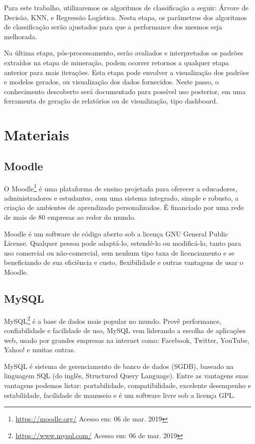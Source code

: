 Para este trabalho, utilizaremos os algoritmos de classificação a seguir: Árvore
de Decisão, KNN, e Regressão Logística. Nesta etapa, os parâmetros dos
algoritmos de classificação serão ajustados para que a performance dos mesmos
seja melhorada.

Na última etapa, pós-processamento, serão avaliados e interpretados os padrões
extraídos na etapa de mineração, podem ocorrer retornos a qualquer etapa
anterior para mais iterações. Esta etapa pode envolver a visualização dos
padrões e modelos gerados, ou visualização dos dados fornecidos. Neste passo, o
conhecimento descoberto será documentado para possível uso posterior, em uma
ferramenta de geração de relatórios ou de visualização, tipo dashboard.

\section{Materiais}

\subsection{Moodle}

O Moodle\footnote{\url{https://moodle.org/} Acesso em: 06 de mar. 2019} é uma
plataforma de ensino projetada para oferecer a educadores, administradores e
estudantes, com uma sistema integrado, simple e robusto, a criação de ambientes
de aprendizado personalizados. É financiado por uma rede de mais de 80 empresas
ao redor do mundo.

Moodle é um software de código aberto sob a licença GNU General Public License.
Qualquer pessoa pode adaptá-lo, estendê-lo ou modificá-lo, tanto para uso
comercial ou não-comercial, sem nenhum tipo taxa de licenciamento e se
beneficiando de sua eficiência e custo, flexibilidade e outras vantagens de usar
o Moodle.

\subsection{MySQL}

MySQL\footnote{\url{https://www.mysql.com/} Acesso em: 06 de mar. 2019} é a base
de dados mais popular no mundo. Provê performance, confiabilidade e facilidade
de uso, MySQL vem liderando a escolha de aplicações web, usado por grandes
empresas na internet como: Facebook, Twitter, YouTube, Yahoo! e muitas outras.

MySQL é sistema de gerenciamento de banco de dados (SGDB), baseado na linguagem
SQL (do inglês, Structured Query Language). Entre as vantagens suas vantagens
podemos listar: portabilidade, compatibilidade, excelente desempenho e
estabilidade, facilidade de manuseio e é um software livre sob a licença GPL.
